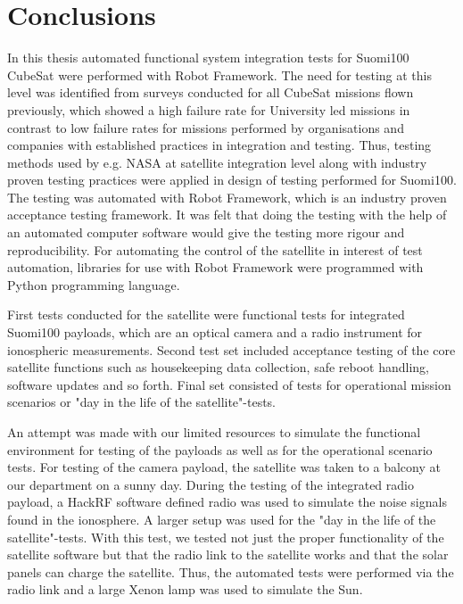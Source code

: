 \documentclass[english,12pt,a4paper,pdftex,elec,utf8]{aaltothesis}
\begin{document}
\section{Conclusions} 
In this thesis automated functional system integration tests for Suomi100 CubeSat were performed with Robot Framework. The need for testing at this level was identified from surveys conducted for all CubeSat missions flown previously, which showed a high failure rate for University led missions in contrast to low failure rates for missions performed by organisations and companies with established practices in integration and testing. Thus, testing methods used by e.g. NASA at satellite integration level along with industry proven testing practices were applied in design of testing performed for Suomi100. The testing was automated with Robot Framework, which is an industry proven acceptance testing framework. It was felt that doing the testing with the help of an automated computer software would give the testing more rigour and reproducibility. For automating the control of the satellite in interest of test automation, libraries for use with Robot Framework were programmed with Python programming language.\par
First tests conducted for the satellite were functional tests for integrated Suomi100 payloads, which are an optical camera and a radio instrument for ionospheric measurements. Second test set included acceptance testing of the core satellite functions  such as housekeeping data collection, safe reboot handling, software updates and so forth. Final set consisted of tests for operational mission scenarios or "day in the life of the satellite"-tests.\par 
An attempt was made with our limited resources to simulate the functional environment for testing of the payloads as well as for the operational scenario tests. For testing of the camera payload, the satellite was taken to a balcony at our department on a sunny day. During the testing of the integrated radio payload,  a HackRF software defined radio was used to simulate the noise signals found in the ionosphere. A larger setup was used for the "day in the life of the satellite"-tests. With this test, we tested not just the proper functionality of the satellite software but that the radio link to the satellite works and that the solar panels can charge the satellite. Thus, the automated tests were performed via the radio link and a large Xenon lamp was used to simulate the Sun.\par 
\end{document}
